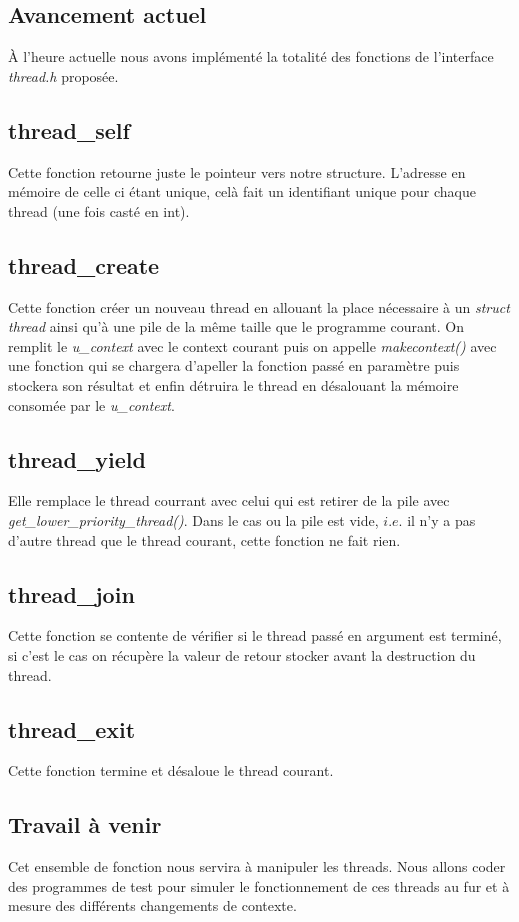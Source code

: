 \subsection*{Avancement actuel}
À l'heure actuelle nous avons implémenté la totalité des fonctions de l'interface \textit{thread.h} proposée. 

\subsection*{thread\_self}
Cette fonction retourne juste le pointeur vers notre structure.
L'adresse en mémoire de celle ci étant unique, celà fait un identifiant unique pour chaque thread (une fois casté en int).

\subsection*{thread\_create}
Cette fonction créer un nouveau thread en allouant la place nécessaire à un \textit{struct thread} ainsi qu'à une pile de la même taille que le programme courant. On remplit le \textit{u\_context} avec le context courant puis on appelle \textit{makecontext()} avec une fonction qui se chargera d'apeller la fonction passé en paramètre puis stockera son résultat et enfin détruira le thread en désalouant la mémoire consomée par le \textit{u\_context}.

\subsection*{thread\_yield}
Elle remplace le thread courrant avec celui qui est retirer de la pile avec \textit{get\_lower\_priority\_thread()}. Dans le cas ou la pile est vide, $i.e.$ il n'y a pas d'autre thread que le thread courant, cette fonction ne fait rien.

\subsection*{thread\_join}
Cette fonction se contente de vérifier si le thread passé en argument est terminé, si c'est le cas on récupère la valeur de retour stocker avant la destruction du thread. 


\subsection*{thread\_exit}
Cette fonction termine et désaloue le thread courant.

\subsection*{Travail à venir}
Cet ensemble de fonction nous servira à manipuler les threads. Nous allons coder des programmes de test pour simuler le fonctionnement de ces threads au fur et à mesure des différents changements de contexte.
